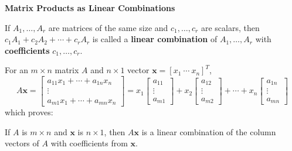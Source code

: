 \documentclass{article}
\newcommand{\redheading}[1]{{\vspace{2mm}\noindent\Large\bfseries\color{red!55!black} #1\par}\vspace{2mm}}
\theoremstyle{mystyle}
\begin{document}
\redheading{Matrix Products as Linear Combinations}

\begin{tcolorbox}[colback=teal!4, colframe=teal!65!black, title=Definition 6, fonttitle=\bfseries, boxrule=0.5mm, arc=3mm]
If $A_1,\dots,A_r$ are matrices of the same size and $c_1,\dots,c_r$ are scalars, then $c_1A_1+c_2A_2+\cdots+c_rA_r$ is called a \textbf{linear combination} of $A_1,\dots,A_r$ with \textbf{coefficients} $c_1,\dots,c_r$.
\end{tcolorbox}

For an $m\times n$ matrix $A$ and $n\times1$ vector $\mathbf{x}=[x_1\ \cdots\ x_n]^T$,
\[
A\mathbf{x}=\begin{bmatrix}a_{11}x_1+\cdots+a_{1n}x_n\\ \vdots \\ a_{m1}x_1+\cdots+a_{mn}x_n\end{bmatrix}
=x_1\begin{bmatrix}a_{11}\\\vdots\\a_{m1}\end{bmatrix}+x_2\begin{bmatrix}a_{12}\\\vdots\\a_{m2}\end{bmatrix}+\cdots+x_n\begin{bmatrix}a_{1n}\\\vdots\\a_{mn}\end{bmatrix} \tag{10}
\]
which proves:

\begin{tcolorbox}[colback=red!4, colframe=red!60!black, title=Theorem 1.3.1, boxrule=0.5mm, arc=3mm]
If $A$ is $m\times n$ and $\mathbf{x}$ is $n\times1$, then $A\mathbf{x}$ is a linear combination of the column vectors of $A$ with coefficients from $\mathbf{x}$.
\end{tcolorbox}
\end{document}
